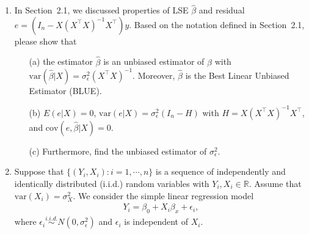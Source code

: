 \documentclass[11pt]{article}
\begin{document}
\begin{enumerate}

\item In Section~2.1, we discussed properties of LSE $\widehat{\beta}$ and residual $e = (I_n - X(X^\top X)^{-1} X^\top)y$. Based on the notation defined in Section~2.1, please show that
\begin{itemize}
\item[(a)] the estimator $\widehat{\beta}$ is an unbiased estimator of $\beta$ with $\text{var}(\widehat{\beta}|X) = \sigma_\epsilon^2 (X^\top X)^{-1}$. Moreover, $\widehat{\beta}$ is the Best Linear Unbiased Estimator (BLUE).

\item[(b)] $E(e | X) = 0$, 
 $\text{var}(e|X) = \sigma_\epsilon^2 (I_n - H)$ with $H = X(X^\top X)^{-1} X^\top$, and $\text{cov}(e,\widehat{\beta}|X) = 0$.
 
\item[(c)] Furthermore, find the unbiased estimator of $\sigma_\epsilon^2$. 
 
\end{itemize}



\item Suppose that $\{(Y_i, X_i) : i=1,\cdots,n\}$ is a sequence of independently and identically distributed (i.i.d.) random variables with $Y_i, X_i \in \mathbb{R}$. Assume that $\text{var}(X_i) = \sigma_X^2$. We consider the simple linear regression model
\begin{eqnarray} \label{model-Q2}
Y_i = \beta_0 + X_i \beta_x + \epsilon_i,
\end{eqnarray}
where $\epsilon_i \stackrel{i.i.d.}{\sim} N(0,\sigma_\epsilon^2)$ and $\epsilon_i$ is independent of $X_i$.
\begin{itemize}


\end{itemize}
\end{enumerate}
\end{document}
